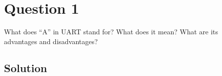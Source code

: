 \section*{Question 1}

What does ``A'' in UART stand for?
What does it mean?
What are its advantages and disadvantages?

\subsection*{Solution}
